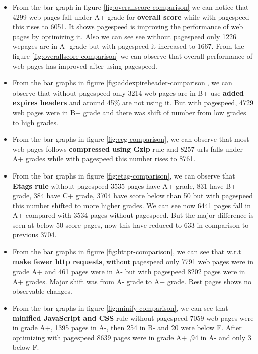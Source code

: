 \documentclass[conference]{IEEEtran}
\begin{document}
\begin{itemize}
\item From the bar graph in figure \ref{fig:overallscore-comparison} we can notice that 4299 web pages fall under
A+ grade for \textbf{overall score} while with pagespeed this rises to 6051. It
shows pagespeed is improving the performance of web pages by optimizing it. Also
we can see see without pagespeed only 1226 wepages are in A- grade but with
pagespeed it increased to 1667. From the figure \ref{fig:overallscore-comparison} we can observe that overall
performance of web pages has improved after using pagespeed.

\item From the bar graphs in figure \ref{fig:addexpireheader-comparison}, we can observe that without pagespeed only 3214
web pages are in B+  use \textbf{added expires headers} and around
45\% are not using it. But with pagespeed, 4729 web pages were in B+ grade and
there was shift of number from low grades to high grades.

\item From the bar graphs in figure \ref{fig:ccg-comparison}, we can observe that most web pages follows \textbf{compressed
using Gzip} rule and 8257 urls falls under A+ grades while with pagespeed this number rises to 8761.

\item From the bar graphs in figure \ref{fig:etag-comparison},
we can observe that \textbf{Etags rule} without pagespeed
3535 pages have A+ grade, 831 have B+ grade, 384 have C+ grade, 3704 have score
below than 50 but with pagespeed this number shifted to more higher grades. We can
see now 6441 pages fall in  A+ compared with 3534 pages without pagespeed. But the major difference is seen
at below 50 score pages, now this have reduced to 633 in comparison to previous
3704.

\item From the bar graphs in figure \ref{fig:httpr-comparison}, we can see that w.r.t \textbf{make fewer http
requests}, without pagespeed only 7791 web pages were in grade A+ and 461 pages
were in A- but with pagespeed 8202 pages were in A+ grades. Major shift was from 
A- grade to A+ grade. Rest pages shows no observable changes.

\item From the bar graphs in figure \ref{fig:minify-comparison}, we can see that \textbf{minified JavaScript and CSS} rule
without pagespeed 7059 web pages were in grade A+, 1395 pages in A-, then 254 in
B- and 20 were below F. After optimizing with pagespeed 8639 pages were in grade A+ ,94 in A- and only 3 below F.
\end{itemize}
\end{document}

